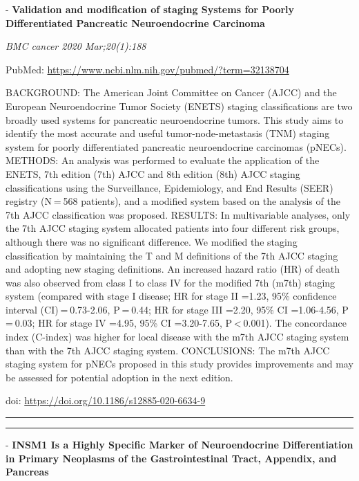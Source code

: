 \documentclass[
]{article}
\begin{document}
- \textbf{Validation and modification of staging Systems for Poorly
Differentiated Pancreatic Neuroendocrine Carcinoma}

\emph{BMC cancer 2020 Mar;20(1):188}

PubMed: \url{https://www.ncbi.nlm.nih.gov/pubmed/?term=32138704}

BACKGROUND: The American Joint Committee on Cancer (AJCC) and the
European Neuroendocrine Tumor Society (ENETS) staging classifications
are two broadly used systems for pancreatic neuroendocrine tumors. This
study aims to identify the most accurate and useful
tumor-node-metastasis (TNM) staging system for poorly differentiated
pancreatic neuroendocrine carcinomas (pNECs). METHODS: An analysis was
performed to evaluate the application of the ENETS, 7th edition (7th)
AJCC and 8th edition (8th) AJCC staging classifications using the
Surveillance, Epidemiology, and End Results (SEER) registry (N = 568
patients), and a modified system based on the analysis of the 7th AJCC
classification was proposed. RESULTS: In multivariable analyses, only
the 7th AJCC staging system allocated patients into four different risk
groups, although there was no significant difference. We modified the
staging classification by maintaining the T and M definitions of the 7th
AJCC staging and adopting new staging definitions. An increased hazard
ratio (HR) of death was also observed from class I to class IV for the
modified 7th (m7th) staging system (compared with stage I disease; HR
for stage II =1.23, 95\% confidence interval (CI) = 0.73-2.06, P = 0.44;
HR for stage III =2.20, 95\% CI =1.06-4.56, P = 0.03; HR for stage IV
=4.95, 95\% CI =3.20-7.65, P \textless{} 0.001). The concordance index
(C-index) was higher for local disease with the m7th AJCC staging system
than with the 7th AJCC staging system. CONCLUSIONS: The m7th AJCC
staging system for pNECs proposed in this study provides improvements
and may be assessed for potential adoption in the next edition.

doi: \url{https://doi.org/10.1186/s12885-020-6634-9}

\begin{center}\rule{0.5\linewidth}{0.5pt}\end{center}

\begin{center}\rule{0.5\linewidth}{0.5pt}\end{center}

- \textbf{INSM1 Is a Highly Specific Marker of Neuroendocrine
Differentiation in Primary Neoplasms of the Gastrointestinal Tract,
Appendix, and Pancreas}
\end{document}
